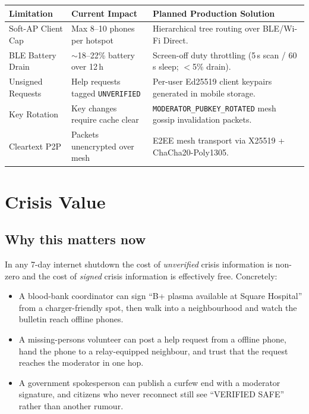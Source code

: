 \documentclass[11pt,a4paper]{article}
\begin{document}
\begin{center}
\begin{tabularx}{\linewidth}{@{}p{3.6cm} p{3.8cm} X@{}}
\toprule
\textbf{Limitation} & \textbf{Current Impact} & \textbf{Planned Production Solution}\\
\midrule
Soft-AP Client Cap & Max 8--10 phones per hotspot & Hierarchical tree routing over BLE/Wi-Fi Direct.\\
BLE Battery Drain & $\sim$18--22\% battery over 12\,h & Screen-off duty throttling (5\,s scan / 60\,s sleep; $<$5\% drain).\\
Unsigned Requests & Help requests tagged \texttt{UNVERIFIED} & Per-user Ed25519 client keypairs generated in mobile storage.\\
Key Rotation & Key changes require cache clear & \texttt{MODERATOR\_PUBKEY\_ROTATED} mesh gossip invalidation packets.\\
Cleartext P2P & Packets unencrypted over mesh & E2EE mesh transport via X25519 + ChaCha20-Poly1305.\\
\bottomrule
\end{tabularx}
\end{center}

\section{Crisis Value}
\label{sec:impact}

\subsection{Why this matters now}
\label{sec:why-now}

In any 7-day internet shutdown the cost of \emph{unverified} crisis
information is non-zero and the cost of \emph{signed} crisis
information is effectively free. Concretely:

\begin{itemize}[leftmargin=*]
  \item A blood-bank coordinator can sign ``B+ plasma available at
        Square Hospital'' from a charger-friendly spot, then walk into
        a neighbourhood and watch the bulletin reach offline phones.
  \item A missing-persons volunteer can post a help request from a
        offline phone, hand the phone to a relay-equipped neighbour,
        and trust that the request reaches the moderator in one hop.
  \item A government spokesperson can publish a curfew end with a
        moderator signature, and citizens who never reconnect still
        see ``VERIFIED SAFE'' rather than another rumour.
\end{itemize}
\end{document}
